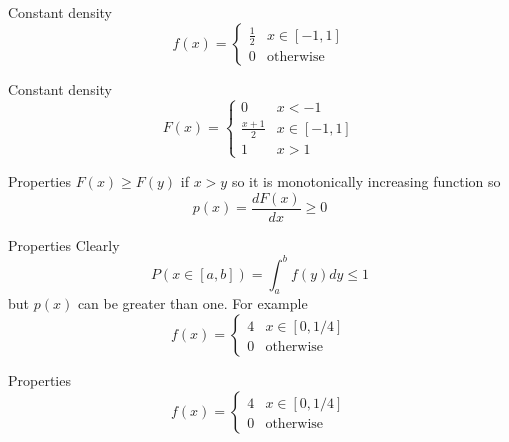 \documentclass{beamer}
\newcommand{\crish}{\color{reddish}}
\newcommand{\cbla}{\color{black}}
\begin{document}
\begin{frame}{Constant density}
\crish$$
f(x)=\left\{\begin{array}{ll}\frac{1}{2}&x\in [-1,1]\\0&\mbox{otherwise}\end{array}\right.
$$\cbla{}
\begin{center}

\end{center}

\end{frame}


\begin{frame}{Constant density}
\crish$$
F(x)=\left\{\begin{array}{ll}0&x<-1\\
\frac{x+1}{2}&x\in [-1,1]\\1&x>1\end{array}\right.
$$\cbla{}

\begin{center}

\end{center}

\end{frame}

\begin{frame}{Properties}
  \crish$F(x)\ge F(y)$\cbla{} if \crish$x>y$\cbla{} so it is monotonically increasing function so
  \crish$$p(x)=\frac{dF(x)}{dx}\ge 0$$\cbla{}
\end{frame}

\begin{frame}{Properties}
  Clearly
\crish$$
  P(x\in [a,b])=\int_a^bf(y)dy\le 1
$$\cbla{}
  but \crish$p(x)$\cbla{} can be greater than one. For example
\crish$$
f(x)=\left\{\begin{array}{ll}4&x\in [0,1/4]\\0&\mbox{otherwise}\end{array}\right.
$$\cbla{}
\end{frame}
  

\begin{frame}{Properties}
\crish$$
f(x)=\left\{\begin{array}{ll}4&x\in [0,1/4]\\0&\mbox{otherwise}\end{array}\right.
$$\cbla{}

\begin{center}

\end{center}

\end{frame}
\end{document}
